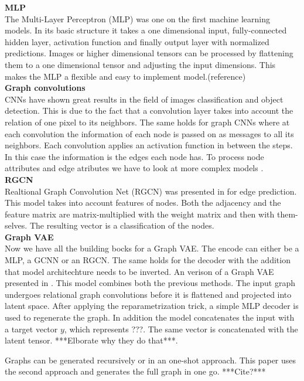 \textbf{MLP}\\
The Multi-Layer Perceptron (MLP) was one on the first machine learning models. In its basic structure it takes a one dimensional input, fully-connected hidden layer, activation function and finally output layer with normalized predictions.
Images or higher dimensional tensors can be processed by flattening them to a one dimensional tensor and adjusting the input dimensions. This makes the MLP a flexible and easy to implement model.(reference)
\\
\textbf{Graph convolutions}\\
CNNs have shown great results in the field of images classification and object detection. This is due to the fact that a convolution layer takes into account the relation of one pixel to its neighbors. The same holds for graph CNNs where at each convolution the information of each node is passed on as messages to all its neighbors. Each convolution applies an activation function in between the steps. In this case the information is the edges each node has. To process node attributes and edge atributes we have to look at more complex models \cite{tiao_variational_nodate}. 
\\
\textbf{RGCN}\\
Realtional Graph Convolution Net (RGCN) was presented in \cite{kipf_semi-supervised_2017} for edge prediction. This model takes into account features of nodes. Both the adjacency and the feature matrix are matrix-multiplied with the weight matrix and then with them-selves. The resulting vector is a classification of the nodes.
\\
\textbf{Graph VAE}\\
Now we have all the building bocks for a Graph VAE. The encode can either be a MLP, a GCNN or an RGCN. The same holds for the decoder with the addition that model architechture needs to be inverted. An verison of a Graph VAE presented in \cite{simonovsky_graphvae_2018}. This model combines both the previous methods. The input graph undergoes relational graph convolutions before it is flattened and projected into latent space. After applying the reparametrization trick, a simple MLP decoder is used to regenerate the graph. In addition the model concatenates the input with a target vector $y$, which represents ???. The same vector is concatenated with the latent tensor. ***Elborate why they do that***.

Graphs can be generated recursively or in an one-shot approach. This paper uses the second approach and generates the full graph in one go. ***Cite?***




